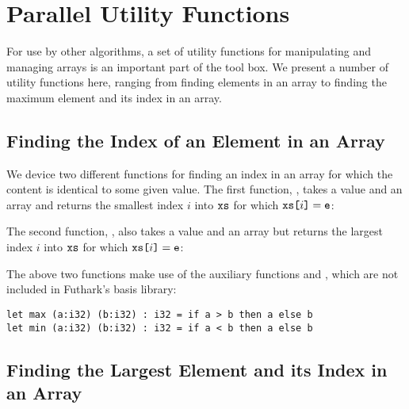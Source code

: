 \documentclass[oneside,11pt]{book}
\newenvironment{wrap}{\vspace{\topskip}\par\noindent\begin{minipage}{\linewidth}}{\end{minipage}\par}
\begin{document}
\begin{wrap}

\end{wrap}

\section{Parallel Utility Functions}
For use by other algorithms, a set of utility functions for
manipulating and managing arrays is an important part of the tool
box. We present a number of utility functions here, ranging from
finding elements in an array to finding the maximum element and its
index in an array.

\subsection{Finding the Index of an Element in an Array}
We device two different functions for finding an index in an array for
which the content is identical to some given value. The first function,
, takes a value  and an array  and
returns the smallest index $i$ into $\texttt{xs}$ for which $\texttt{xs[}i\texttt{]} =
\texttt{e}$:

\begin{wrap}

\end{wrap}

The second function,
, also takes a value  and an array  but
returns the largest index $i$ into $\texttt{xs}$ for which $\texttt{xs[}i\texttt{]} =
\texttt{e}$:

\begin{wrap}

\end{wrap}

The above two functions make use of the auxiliary functions  and
, which are not included in Futhark's basis library:

\begin{lstlisting}
let max (a:i32) (b:i32) : i32 = if a > b then a else b
let min (a:i32) (b:i32) : i32 = if a < b then a else b
\end{lstlisting}

\subsection{Finding the Largest Element and its Index in an Array}
\end{document}
